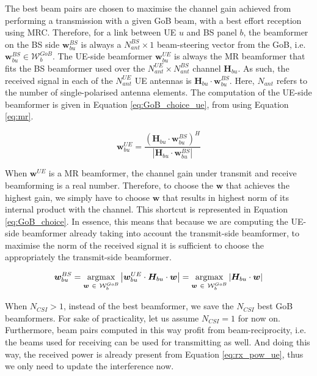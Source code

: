 The best beam pairs are chosen to maximise the channel gain achieved from performing a transmission with a given GoB beam, with a best effort reception using \acs{MRC}. Therefore, for a link between UE $u$ and BS panel $b$, the beamformer on the BS side $\bm{w}^{BS}_{bu}$ is always a $N_{ant}^{BS}\times 1$ beam-steering vector from the GoB, i.e. $\bm{w}^{BS}_{bu} \in \mathcal{W}^{GoB}_b$. The UE-side beamformer $\bm{w}^{UE}_{bu}$ is always the \ac{MR} beamformer that fits the BS beamformer used over the $N_{ant}^{UE} \times N_{ant}^{BS}$ channel $\bm{H}_{bu}$. As such, the received signal in each of the $N_{ant}^{UE}$ UE antennas is $\bm{H}_{bu} \cdot \bm{w}^{BS}_{bu}$. Here, $N_{ant}$ refers to the number of single-polarised antenna elements. The computation of the UE-side beamformer is given in Equation \ref{eq:GoB_choice_ue}, from using Equation \ref{eq:mr}. 


\begin{equation} \label{eq:GoB_choice_ue}
    \bm{w}^{UE}_{bu} = \frac{\left(\bm{H}_{bu} \cdot \bm{w}^{BS}_{bu}\right)^H}{\left|\bm{H}_{bu} \cdot \bm{w}^{BS}_{bu}\right|}
\end{equation}


When $\bm{w}^{UE}$ is a MR beamformer, the channel gain under transmit and receive beamforming is a real number. Therefore, to choose the $\bm{w}$ that achieves the highest gain, we simply have to choose $\bm{w}$ that results in highest norm of its internal product with the channel. This shortcut is represented in Equation \eqref{eq:GoB_choice}. In essence, this means that because we are computing the UE-side beamformer already taking into account the transmit-side beamformer, to maximise the norm of the received signal it is sufficient to choose the appropriately the transmit-side beamformer. 

\begin{equation} \label{eq:GoB_choice}
    \bm{w}^{BS}_{bu} = \operatorname*{argmax}_{\bm{w} \ \in \ \mathcal{W}^{GoB}_b} \left| \bm{w}^{UE}_{bu} \cdot \bm{H}_{bu} \cdot \bm{w} \right| = \operatorname*{argmax}_{\bm{w} \ \in \ \mathcal{W}^{GoB}_b} \left| \bm{H}_{bu} \cdot \bm{w}\right|
\end{equation}

When $N_{CSI} > 1$, instead of the best beamformer, we save the $N_{CSI}$ best GoB beamformers. For sake of practicality, let us assume $N_{CSI} = 1$ for now on. Furthermore, beam pairs computed in this way profit from beam-reciprocity, i.e. the beams used for receiving can be used for transmitting as well. And doing this way, the received power is already present from Equation \eqref{eq:rx_pow_ue}, thus we only need to update the interference now.

